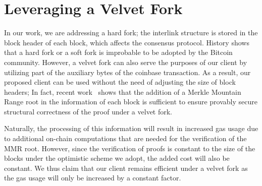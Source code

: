 \section{Leveraging a Velvet Fork}

In our work, we are addressing a hard fork; the interlink structure is stored
in the block header of each block, which affects the consensus protocol.
History shows that a hard fork or a soft fork is improbable to be adopted by
the Bitcoin community. However, a velvet fork can also serve the purposes of
our client by utilizing part of the auxiliary bytes of the coinbase
transaction. As a result, our proposed client can be used without the need of
adjusting the size of block headers; In fact, recent
work~\cite{velvet-nipopows} shows that the addition of a Merkle Mountain Range
root in the information of each block is sufficient to ensure provably secure
structural correctness of the proof under a velvet fork.

Naturally, the processing of this information will result in increased gas usage
due to additional on-chain computations that are needed for the verification of
the MMR root. However, since the verification of proofs is constant to the size
of the blocks under the optimistic scheme we adopt, the added cost will also be
constant. We thus claim that our client remains efficient under a velvet fork
as the gas usage will only be increased by a constant factor.
